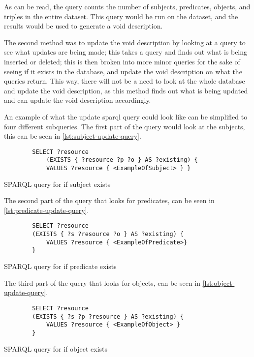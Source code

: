 As can be read, the query counts the number of subjects, predicates, objects, and triples in the entire dataset. This query would be run on the dataset, and the results would be used to generate a \gls{void} description.


The second method was to update the \gls{void} description by looking at a query to see what updates are being made; this takes a query and finds out what is being inserted or deleted; this is then broken into more minor queries for the sake of seeing if it exists in the database, and update the \gls{void} description on what the queries return. This way, there will not be a need to look at the whole database and update the \gls{void} description, as this method finds out what is being updated and can update the \gls{void} description accordingly.

An example of what the update \gls{sparql} query could look like can be simplified to four different subqueries. The first part of the query would look at the subjects, this can be seen in \autoref{lst:subject-update-query}.

\begin{listing}[!ht]
    \begin{verbatim}          
        SELECT ?resource
            (EXISTS { ?resource ?p ?o } AS ?existing) {
            VALUES ?resource { <ExampleOfSubject> } }
    \end{verbatim}
    \caption{SPARQL query for if subject exists}
    \label{lst:subject-update-query}
\end{listing}

The second part of the query that looks for predicates, can be seen in \autoref{lst:predicate-update-query}.
\begin{listing}[!ht]
    \begin{verbatim}          
        SELECT ?resource 
        (EXISTS { ?s ?resource ?o } AS ?existing) { 
            VALUES ?resource { <ExampleOfPredicate>}
        } 
    \end{verbatim}
    \caption{SPARQL query for if predicate exists}
    \label{lst:predicate-update-query}
\end{listing}


The third part of the query that looks for objects, can be seen in \autoref{lst:object-update-query}.

\begin{listing}[!ht]
    \begin{verbatim}          
        SELECT ?resource 
        (EXISTS { ?s ?p ?resource } AS ?existing) { 
            VALUES ?resource { <ExampleOfObject> } 
        }
    \end{verbatim}
    \caption{SPARQL query for if object exists}
    \label{lst:object-update-query}
\end{listing}

